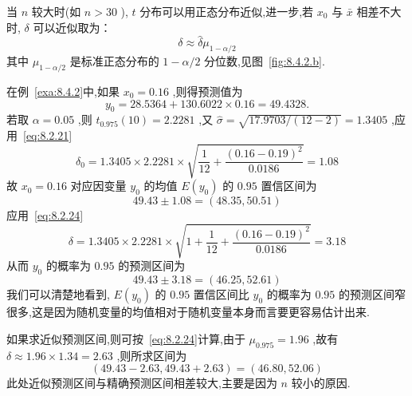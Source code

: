 当 $ n $ 较大时(如 $ n>30 $ ), $ t $ 分布可以用正态分布近似,进一步,若 $ x_0 $ 与 $ \bar{x} $ 相差不大时, $ \delta $ 可以近似取为：
\begin{equation}
\delta\approx \hat{\delta}\mu_{1-\alpha/2}	\label{eq:8.2.24}
\end{equation}
其中 $ \mu_{1-\alpha/2} $ 是标准正态分布的 $ 1-\alpha/2 $ 分位数,见图~\ref{fig:8.4.2.b}.

\begin{example}{}{}
	在例~\ref{exa:8.4.2}中,如果 $ x_0=0.16 $ ,则得预测值为
	\[
	y_0=28.5364+130.6022×0.16=49.4328.
	\]
	若取 $ \alpha=0.05 $ ,则 $ t_{0.975}(10)=2.2281 $ ,又 $ \hat{\sigma}=\sqrt{17.9703/(12-2)}=1.3405 $ ,应用~\ref{eq:8.2.21}
	\[
	\delta_{0}=1.3405 \times 2.2281 \times \sqrt{\frac{1}{12}+\frac{(0.16-0.19)^{2}}{0.0186}}=1.08
	\]
	故 $ x_0=0.16 $ 对应因变量 $ y_0 $ 的均值 $ E(y_0) $ 的 $ 0.95 $ 置信区间为
	\[
	49.43\pm 1.08=\left( 48.35,50.51 \right) 
	\]
	应用~\ref{eq:8.2.24}
	\[
	\delta=1.3405 \times 2.2281 \times \sqrt{1+\frac{1}{12}+\frac{(0.16-0.19)^{2}}{0.0186}}=3.18
	\]
	从而 $ y_0 $ 的概率为 $ 0.95 $ 的预测区间为
	\[
	49.43\pm 3.18=(46.25,52.61)
	\]
	我们可以清楚地看到, $ E(y_0) $ 的 $ 0.95 $ 置信区间比 $ y_0 $ 的概率为 $ 0.95 $ 的预测区间窄很多,这是因为随机变量的均值相对于随机变量本身而言要更容易估计出来.
	
	如果求近似预测区间,则可按~\ref{eq:8.2.24}计算,由于 $ \mu_{0.975}=1.96 $ ,故有
	$ \delta\approx 1.96\times 1.34=2.63 $ ,则所求区间为
	\[
	(49.43-2.63,49.43+2.63)=(46.80,52.06)
	\]
	此处近似预测区间与精确预测区间相差较大,主要是因为 $ n $ 较小的原因.
\end{example}

